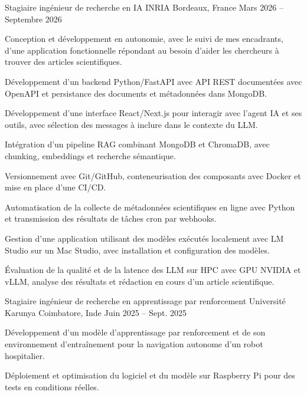 
\begin{cventries}
  \cventry
    {Stagiaire ingénieur de recherche en IA}
    {INRIA}
    {Bordeaux, France}
    {Mars 2026 -- Septembre 2026}
    {
      \begin{cvitems}
        \item {Conception et développement en autonomie, avec le suivi de mes encadrants, d’une application fonctionnelle répondant au besoin d’aider les chercheurs à trouver des articles scientifiques.}
        \item {Développement d’un backend Python/FastAPI avec API REST documentées avec OpenAPI et persistance des documents et métadonnées dans MongoDB.}
        \item {Développement d’une interface React/Next.js pour interagir avec l’agent IA et ses outils, avec sélection des messages à inclure dans le contexte du LLM.}
        \item {Intégration d’un pipeline RAG combinant MongoDB et ChromaDB, avec chunking, embeddings et recherche sémantique.}
        \item {Versionnement avec Git/GitHub, conteneurisation des composants avec Docker et mise en place d’une CI/CD.}
        \item {Automatisation de la collecte de métadonnées scientifiques en ligne avec Python et transmission des résultats de tâches cron par webhooks.}
        \item {Gestion d’une application utilisant des modèles exécutés localement avec LM Studio sur un Mac Studio, avec installation et configuration des modèles.}
        \item {Évaluation de la qualité et de la latence des LLM sur HPC avec GPU NVIDIA et vLLM, analyse des résultats et rédaction en cours d’un article scientifique.}
      \end{cvitems}
    }

  \cventry
    {Stagiaire ingénieur de recherche en apprentissage par renforcement}
    {Université Karunya}
    {Coimbatore, Inde}
    {Juin 2025 -- Sept. 2025}
    {
      \begin{cvitems}
        \item {Développement d’un modèle d’apprentissage par renforcement et de son environnement d’entraînement pour la navigation autonome d’un robot hospitalier.}
        \item {Déploiement et optimisation du logiciel et du modèle sur Raspberry Pi pour des tests en conditions réelles.}
      \end{cvitems}
    }
\end{cventries}
